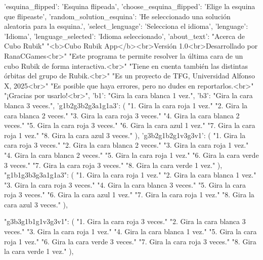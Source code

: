 {{        'esquina_flipped': 'Esquina flipeada',
        'choose_esquina_flipped': 'Elige la esquina que flipeaste',
        'random_solution_esquina': 'He seleccionado una solución aleatoria para la esquina.',
        'select_lenguage': 'Selecciona el idioma',
        'lenguage':        'Idioma',
        'lenguage_selected': 'Idioma seleccionado',
        'about_text':      "Acerca de Cubo Rubik"
                            "<b>Cubo Rubik App</b><br>Versión 1.0<br>Desarrollado por RanaCGames<br>"
                            "Este programa te permite resolver la última cara de un cubo Rubik de forma interactiva.<br>"
                            "Tiene en cuenta también las distintas órbitas del grupo de Rubik.<br>"
                            "Es un proyecto de TFG, Universidad Alfonso X, 2025<br>"
                            "Es posible que haya errores, pero no dudes en reportarlos.<br>"
                            "¡Gracias por usarlo!<br>",
        'b1': "Gira la cara blanca 1 vez.",
        'b3': "Gira la cara blanca 3 veces.",
        'g1b2g3b2g3a1g1a3': (
            "1. Gira la cara roja 1 vez.\n"
            "2. Gira la cara blanca 2 veces.\n"
            "3. Gira la cara roja 3 veces.\n"
            "4. Gira la cara blanca 2 veces.\n"
            "5. Gira la cara roja 3 veces.\n"
            "6. Gira la cara azul 1 vez.\n"
            "7. Gira la cara roja 1 vez.\n"
            "8. Gira la cara azul 3 veces."
        ),
        'g3b2g1b2g1v3g3v1': (
            "1. Gira la cara roja 3 veces.\n"
            "2. Gira la cara blanca 2 veces.\n"
            "3. Gira la cara roja 1 vez.\n"
            "4. Gira la cara blanca 2 veces.\n"
            "5. Gira la cara roja 1 vez.\n"
            "6. Gira la cara verde 3 veces.\n"
            "7. Gira la cara roja 3 veces.\n"
            "8. Gira la cara verde 1 vez."
        ),
        "g1b1g3b3g3a1g1a3": (
        "1. Gira la cara roja 1 vez.\n"
        "2. Gira la cara blanca 1 vez.\n"
        "3. Gira la cara roja 3 veces.\n"
        "4. Gira la cara blanca 3 veces.\n"
        "5. Gira la cara roja 3 veces.\n"
        "6. Gira la cara azul 1 vez.\n"
        "7. Gira la cara roja 1 vez.\n"
        "8. Gira la cara azul 3 veces."
    ),
    
    "g3b3g1b1g1v3g3v1": (
        "1. Gira la cara roja 3 veces.\n"
        "2. Gira la cara blanca 3 veces.\n"
        "3. Gira la cara roja 1 vez.\n"
        "4. Gira la cara blanca 1 vez.\n"
        "5. Gira la cara roja 1 vez.\n"
        "6. Gira la cara verde 3 veces.\n"
        "7. Gira la cara roja 3 veces.\n"
        "8. Gira la cara verde 1 vez."
    ),
    
}}
